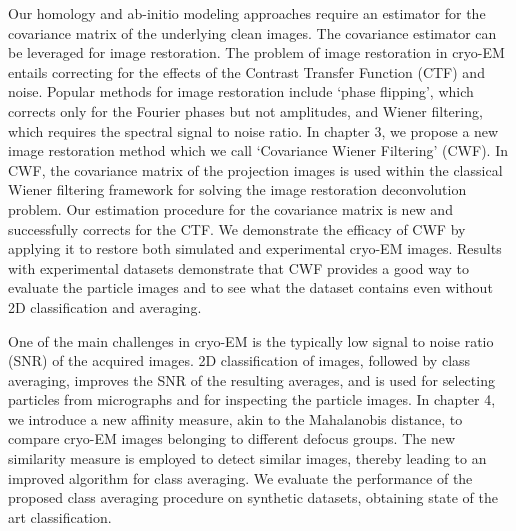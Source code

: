 Our homology and ab-initio modeling approaches require an estimator for the covariance matrix of the underlying clean images. The covariance estimator can be leveraged for image restoration. The problem of image restoration in cryo-EM entails correcting for the effects of the Contrast Transfer
Function (CTF) and noise. Popular methods for image restoration include
`phase flipping', which corrects only for the Fourier phases but not amplitudes, and Wiener filtering, which
requires the spectral signal to noise ratio. In chapter 3, we propose a new image restoration method
which we call `Covariance Wiener Filtering' (CWF).
In CWF, the covariance matrix of the projection images is used within the 
classical Wiener filtering framework for solving the image restoration 
deconvolution problem. Our estimation procedure for the covariance matrix is new 
and successfully corrects for the CTF.   
We demonstrate the efficacy of CWF by applying it to restore both simulated and experimental cryo-EM images.
Results with experimental datasets demonstrate that CWF provides a good way to 
evaluate the particle images and to see what the dataset contains even without 2D 
classification and averaging.

One of the main challenges in cryo-EM is the typically low signal to noise ratio (SNR) of the acquired images. 2D classification of images, followed by class averaging, improves the SNR of the resulting averages, and is used for selecting particles from micrographs and for inspecting the particle images. In chapter 4, we introduce a new affinity measure, akin to the Mahalanobis distance, to compare cryo-EM images belonging to different defocus groups. The new similarity measure is employed to detect similar images, thereby leading to an improved algorithm for class averaging. We evaluate the performance of the proposed class averaging procedure on synthetic datasets, obtaining state of the art classification. 

